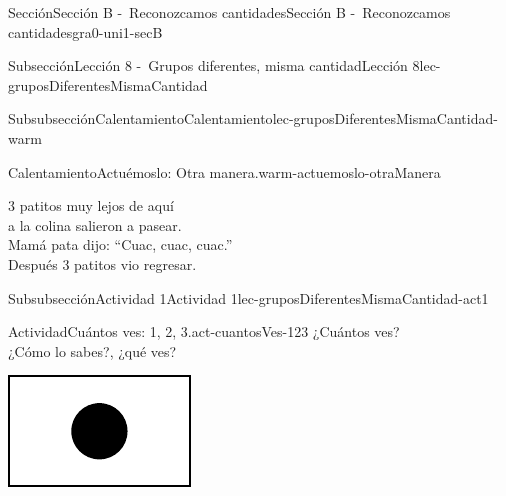 \documentclass[twoside,10pt,]{article}
\begin{document}
\begin{sectionptx}{Sección}{Sección B -~Reconozcamos cantidades}{}{Sección B -~Reconozcamos cantidades}{}{}{gra0-uni1-secB}
\begin{subsectionptx}{Subsección}{Lección 8 -~Grupos diferentes, misma cantidad}{}{Lección 8}{}{}{lec-gruposDiferentesMismaCantidad}
\begin{subsubsectionptx}{Subsubsección}{Calentamiento}{}{Calentamiento}{}{}{lec-gruposDiferentesMismaCantidad-warm}
\begin{exploration}{Calentamiento}{Actuémoslo: Otra manera.}{warm-actuemoslo-otraManera}
\begin{image}{0.2}{0.6}{0.2}{}
\end{image}%
%
\par
3 patitos muy lejos de aquí\\
 a la colina salieron a pasear.\\
 Mamá pata dijo: “Cuac, cuac, cuac.”\\
 Después 3 patitos vio regresar.%
\end{exploration}%
\end{subsubsectionptx}
%
%
\typeout{************************************************}
\typeout{************************************************}
%
\begin{subsubsectionptx}{Subsubsección}{Actividad 1}{}{Actividad 1}{}{}{lec-gruposDiferentesMismaCantidad-act1}
\begin{activity}{Actividad}{Cuántos ves: 1, 2, 3.}{act-cuantosVes-123}%
¿Cuántos ves?\\
 ¿Cómo lo sabes?, ¿qué ves?%
\begin{sidebyside}{3}{0.0416666666666667}{0.0416666666666667}{0.0833333333333333}%
\begin{sbspanel}{0.25}%
\includegraphics[width=\linewidth]{external/svg-source/tikz-file-136322.pdf}
\end{sbspanel}%
\begin{sbspanel}{0.25}%

\end{sbspanel}
\end{sidebyside}
\end{activity}
\end{subsubsectionptx}
\end{subsectionptx}
\end{sectionptx}
\end{document}
